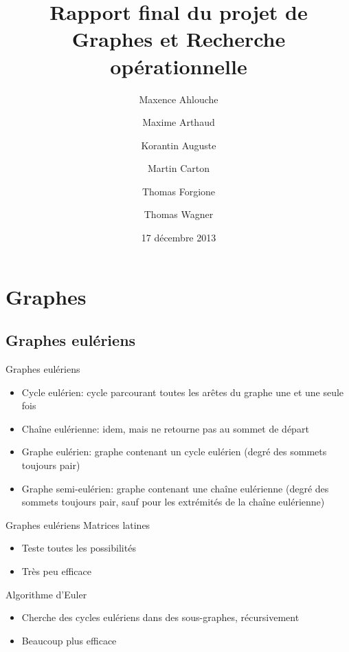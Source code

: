 \documentclass{beamer}
\title[Rapport final de GRO]
      {Rapport final du projet de\\Graphes et Recherche opérationnelle}
\institute{Enseeiht}
\author
  [Ahlouche \and Arthaud \and Auguste
    \and Carton \and Forgione \and Wagner]
  {Maxence Ahlouche \and Maxime Arthaud \and Korantin Auguste
    \and Martin Carton \and Thomas Forgione \and Thomas Wagner}
\date{17 décembre 2013}
\begin{document}
\begin{frame}
  \titlepage
\end{frame}


\section{Graphes}

\subsection{Graphes eulériens}
\begin{frame}{Graphes eulériens}
  \begin{itemize}
    \item Cycle eulérien: cycle parcourant toutes les arêtes du graphe une et une seule fois
    \item Chaîne eulérienne: idem, mais ne retourne pas au sommet de départ
    \item Graphe eulérien: graphe contenant un cycle eulérien (degré des sommets toujours pair)
    \item Graphe semi-eulérien: graphe contenant une chaîne eulérienne (degré des sommets toujours pair, sauf pour les extrémités de la chaîne eulérienne)
  \end{itemize}
\end{frame}

\begin{frame}{Graphes eulériens}
  Matrices latines
  \begin{itemize}
  \item Teste toutes les possibilités
  \item Très peu efficace
  \end{itemize}
  Algorithme d'Euler
  \begin{itemize}
  \item Cherche des cycles eulériens dans des sous-graphes, récursivement
  \item Beaucoup plus efficace
  \end{itemize}
\end{frame}
\end{document}
